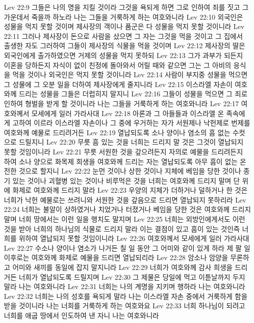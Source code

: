 Lev 22:9  그들은 나의 명을 지킬 것이라 그것을 욕되게 하면 그로 인하여 죄를 짓고 그 가운데서 죽을까 하노라 나는 그들을 거룩하게 하는 여호와니라
Lev 22:10  외국인은 성물을 먹지 못할 것이며 제사장의 객이나 품군은 다 성물을 먹지 못할 것이니라
Lev 22:11  그러나 제사장이 돈으로 사람을 샀으면 그 자는 그것을 먹을 것이고 그 집에서 출생한 자도 그러하여 그들이 제사장의 식물을 먹을 것이며
Lev 22:12  제사장의 딸은 외국인에게 출가하였으면 거제의 성물을 먹지 못하되
Lev 22:13  그가 과부가 되든지 이혼을 당하든지 자식이 없이 친정에 돌아와서 어릴 때와 같으면 그는 그 아비의 응식을 먹을 것이나 외국인은 먹지 못할 것이니라
Lev 22:14  사람이 부지중 성물을 먹으면 그 성물에 그 오분 일을 더하여 제사장에게 줄지니라
Lev 22:15  이스라엘 자손이 여호와께 드리는 성물을 그들은 더럽히지 말지니
Lev 22:16  그들이 성물을 먹으면 그 죄로 인하여 형벌을 받게 할 것이니라 나는 그들을 거룩하게 하는 여호와니라
Lev 22:17  여호와께서 모세에게 일러 가라사대
Lev 22:18  아론과 그 아들들과 이스라엘 온 족속에게 고하여 이르라 이스라엘 자손이나 그 중에 우거하는 자가 서원제나 낙헌제로 번제를 여호와께 예물로 드리려거든
Lev 22:19  열납되도록 소나 양이나 염소의 흠 없는 수컷으로 드릴지니
Lev 22:20  무릇 흠 있는 것을 너희는 드리지 말 것은 그것이 열납되지 못할 것임이니라
Lev 22:21  무릇 서원한 것을 갚으려든지 자의로 예물을 드리려든지 하여 소나 양으로 화목제 희생을 여호와께 드리는 자는 열납되도록 아무 흠이 없는 온전한 것으로 할지니
Lev 22:22  눈먼 것이나 상한 것이나 지체에 베임을 당한 것이나 종기 있는 것이나 괴혈병 있는 것이나 비루먹은 것을 너희는 여호와께 드리지 말며 단 위에 화제로 여호와께 드리지 말라
Lev 22:23  우양의 지체가 더하거나 덜하거나 한 것은 너희가 낙헌 예물로는 쓰려니와 서원한 것을 갚음으로 드리면 열납되지 못하리라
Lev 22:24  너희는 불알이 상하였거나 치었거나 터졌거나 베임을 당한 것은 여호와께 드리지 말며 너희 땅에서는 이런 일을 행치도 말지며
Lev 22:25  너희는 외방인에게서도 이런 것을 받아 너희의 하나님의 식물로 드리지 말라 이는 결점이 있고 흠이 있는 것인즉 너희를 위하여 열납되지 못할 것임이니라
Lev 22:26  여호와께서 모세에게 일러 가라사대
Lev 22:27  수소나 양이나 염소가 나거든 칠 일 동안 그 어미와 같이 있게 하라 제 팔 일 이후로는 여호와께 화제로 예물을 드리면 열납되리라
Lev 22:28  암소나 암양을 무론하고 어미와 새끼를 동일에 잡지 말지니라
Lev 22:29  너희가 여호와께 감사 희생을 드리거든 너희가 열납되도록 드릴지며
Lev 22:30  그 제물은 당일에 먹고 이튿날까지 두지 말라 나는 여호와니라
Lev 22:31  너희는 나의 계명을 지키며 행하라 나는 여호와니라
Lev 22:32  너희는 나의 성호를 욕되게 말라 나는 이스라엘 자손 중에서 거룩하게 함을 받을 것이니라 나는 너희를 거룩하게 하는 여호와요
Lev 22:33  너희 하나님이 되려고 너희를 애굽 땅에서 인도하여 낸 자니 나는 여호와니라
